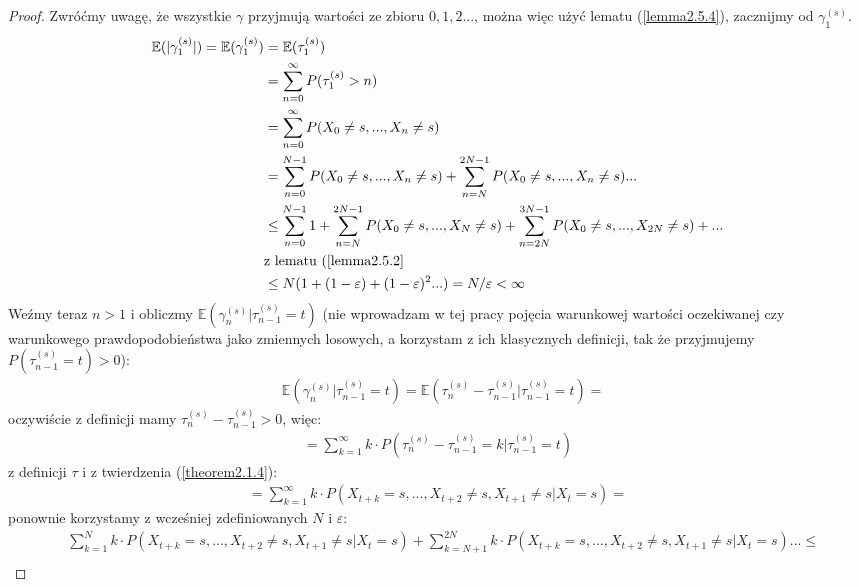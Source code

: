 \documentclass[a4paper]{article}
\theoremstyle{defn}
\theoremstyle{theorem}
\theoremstyle{lemma}
\theoremstyle{cor}
\theoremstyle{fact}
\begin{document}
\begin{proof}
Zwróćmy uwagę, że wszystkie $\gamma$ przyjmują wartości ze zbioru $0,1,2...$, można więc użyć lematu (\ref{lemma2.5.4}), zacznijmy od $\gamma_1^{(s)}$.
\begin{align*}
    \mathbb{E}(|\gamma_1^{(s)}|) = \mathbb{E}(\gamma_1^{(s)}) &= \mathbb{E}(\tau_1^{(s)})\\
    &= \sum\limits_{n = 0}^{\infty} P(\tau_1^{(s)} > n) \\
    &= \sum\limits_{n = 0}^{\infty} P(X_0 \neq s,..., X_n \neq s) \\
    &= \sum\limits_{n = 0}^{N-1} P(X_0 \neq s,..., X_n \neq s) + \sum\limits_{n = N}^{2N - 1} P(X_0 \neq s,..., X_n \neq s) ...\\
    &\leq \sum\limits_{n = 0}^{N-1} 1 + \sum\limits_{n = N}^{2N - 1} P(X_0 \neq s,..., X_N \neq s) + \sum\limits_{n = 2N}^{3N - 1} P(X_0 \neq s,..., X_{2N} \neq s)+...\\
    &\text{z lematu (\ref{lemma2.5.2}}\\
    &\leq N(1 + (1-\varepsilon) + (1 - \varepsilon)^2 ...) = N/\varepsilon < \infty
\end{align*}
Weźmy teraz $n>1$ i obliczmy $\mathbb{E}(\gamma^{(s)}_n|\tau^{(s)}_{n-1} = t)$ (nie wprowadzam w tej pracy pojęcia warunkowej wartości oczekiwanej czy warunkowego prawdopodobieństwa jako zmiennych losowych, a korzystam z ich klasycznych definicji, tak że przyjmujemy $P(\tau^{(s)}_{n-1} = t) > 0$):
\begin{align*}
    &\mathbb{E}(\gamma^{(s)}_n|\tau^{(s)}_{n-1} = t) = \mathbb{E}(\tau^{(s)}_{n}-\tau^{(s)}_{n-1}|\tau^{(s)}_{n-1} = t) =
\end{align*}
oczywiście z definicji mamy $\tau^{(s)}_{n}-\tau^{(s)}_{n-1} > 0$, więc:
\begin{align*}
    =\sum\limits_{k = 1}^{\infty} k\cdot P(\tau^{(s)}_{n}-\tau^{(s)}_{n-1} = k|\tau^{(s)}_{n-1} = t)
\end{align*}
z definicji $\tau$ i z twierdzenia (\ref{theorem2.1.4}):
\begin{align*}
    =\sum\limits_{k = 1}^{\infty} k\cdot P(X_{t+k} = s, ..., X_{t+2} \neq s, X_{t+1} \neq s| X_t = s) =
\end{align*}
ponownie korzystamy z wcześniej zdefiniowanych $N$ i $\varepsilon$:
\begin{align*}
    &\sum\limits_{k = 1}^{N} k \cdot P(X_{t+k} = s, ..., X_{t+2} \neq s, X_{t+1} \neq s| X_t = s) + \sum\limits_{k = N+1}^{2N} k\cdot P(X_{t+k} = s, ..., X_{t+2} \neq s, X_{t+1} \neq s| X_t = s)...\leq\\

\end{align*}
\end{proof}
\end{document}
